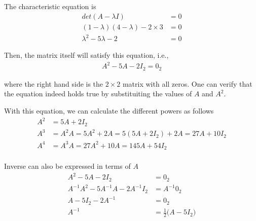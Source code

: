 \documentclass[../../linear_algebra.tex]{subfiles}
\begin{document}
The characteristic equation is
\begin{align*}
    det(A - \lambda I) &= 0\\
    (1-\lambda)(4-\lambda) - 2 \times 3 &= 0\\
    \lambda^{2} - 5\lambda - 2 &= 0
\end{align*}

Then, the matrix itself will satisfy this equation, i.e.,
\begin{align*}
    A^{2} - 5A - 2I_{2} = 0_{2}
\end{align*}

where the right hand side is the $2 \times 2$ matrix with all zeros. One can verify that the equation indeed holds true by substituiting the values of $A$ and $A^{2}$.\newline

With this equation, we can calculate the different powers as follows
\begin{align*}
    A^{2} &= 5A + 2I_{2}\\
    A^{3} &= A^{2}A = 5A^{2} + 2A = 5(5A + 2I_{2}) + 2A = 27A + 10I_{2}\\
    A^{4} &= A^{3}A = 27A^{2} + 10A = 145A + 54I_{2}\\
\end{align*}

Inverse can also be expressed in terms of $A$
\begin{align*}
    A^{2} - 5A - 2I_{2} &= 0_{2}\\
    A^{-1}A^{2} - 5A^{-1}A - 2A^{-1}I_{2} &= A^{-1}0_{2}\\
    A - 5I_{2} - 2A^{-1} &= 0_{2}\\
    A^{-1} &= \frac{1}{2} \bigg( A - 5I_{2} \bigg)
\end{align*}
\end{document}
